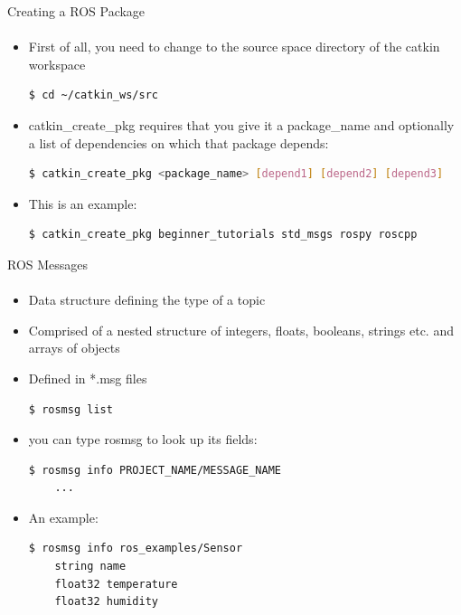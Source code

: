 \documentclass[aspectratio=169]{beamer}
\begin{document}
\begin{frame}[fragile]{Creating a ROS Package}
	\framesubtitle{ }
    \begin{itemize}
        \item First of all, you need to change to the source space directory of the catkin workspace
		\begin{lstlisting}[language=bash]
	$ cd ~/catkin_ws/src
		\end{lstlisting}
		\item catkin\_create\_pkg requires that you give it a package\_name and optionally a list of dependencies on which that package depends:
		\begin{lstlisting}[language=bash]
	$ catkin_create_pkg <package_name> [depend1] [depend2] [depend3]
		\end{lstlisting}
		\item This is an example:
		\begin{lstlisting}[language=bash]
			$ catkin_create_pkg beginner_tutorials std_msgs rospy roscpp
		\end{lstlisting}
	\end{itemize}
\end{frame}

\begin{frame}[fragile]{ROS Messages}
	\framesubtitle{ }
	\begin{minipage}{0.6\textwidth}
    \begin{itemize}
        \item Data structure defining the type of a topic
		\item Comprised of a nested structure of integers, floats, booleans, strings etc. and arrays of objects
		\item Defined in *.msg files
		\begin{lstlisting}[language=bash]
	$ rosmsg list
		\end{lstlisting}
		\item you can type rosmsg to look up its fields:
		\begin{lstlisting}[language=bash]
	$ rosmsg info PROJECT_NAME/MESSAGE_NAME
	...
		\end{lstlisting}

		\item An example:
		\begin{lstlisting}[language=bash]
	$ rosmsg info ros_examples/Sensor 
	string name
	float32 temperature
	float32 humidity	
		\end{lstlisting}

    \end{itemize}

\end{minipage}
\begin{minipage}{0.4\textwidth}
	
\end{minipage}
\end{frame}
\end{document}
